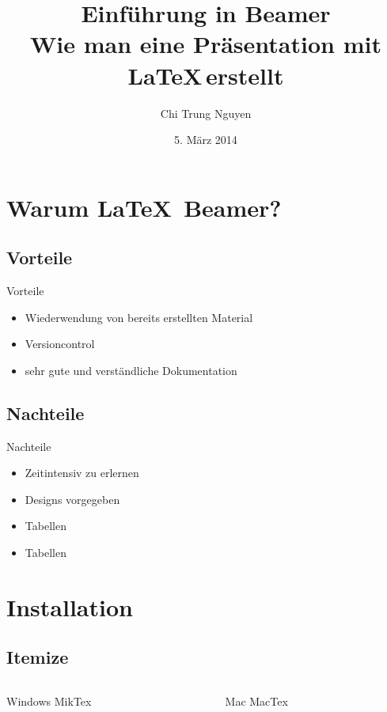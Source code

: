\documentclass[xcolor=x11names,compress]{beamer} %
\title[Latex Beamer Einführung]{Einführung in Beamer\\Wie man eine Präsentation mit \LaTeX \,erstellt}
\author{Chi Trung Nguyen}
\institute{HfTL}
\date{5. März 2014}
\renewcommand{\(}{\begin{columns}}
\renewcommand{\)}{\end{columns}}
\newcommand{\<}[1]{\begin{column}{#1}}
\renewcommand{\>}{\end{column}}
\begin{document}
	\begin{frame}
		\titlepage
	\end{frame}


\section{Warum \LaTeX\, Beamer?}
	\subsection{Vorteile}
		\begin{frame}{Vorteile}
			\begin{itemize}
				\item Wiederwendung von bereits erstellten Material
				\pause
				\item Versioncontrol
				\pause
				\item sehr gute und verständliche Dokumentation
			\end{itemize}

		\end{frame}

	\subsection{Nachteile}
		\begin{frame}{Nachteile}
			\begin{itemize}
				\item Zeitintensiv zu erlernen
				\pause
				\item Designs vorgegeben
				\pause
				\item Tabellen
				\pause
				\item Tabellen
			\end{itemize}
		\end{frame}

\section{Installation}
	\subsection{Itemize}
		\begin{frame}
			\begin{columns}
				\begin{column}[l]{5cm}
					\begin{block}{Windows}
						MikTex
					\end{block}
				\end{column}
				\pause
				\begin{column}[r]{5cm}
					\begin{block}{Mac}
						MacTex
					\end{block}
				\end{column}
			\end{columns}
		\end{frame}
\end{document}
